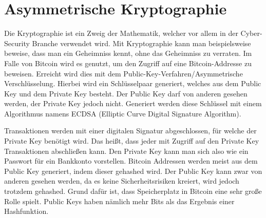 \section{Asymmetrische Kryptographie}
Die Kryptographie ist ein Zweig der Mathematik, welcher vor allem in der Cyber-Security Branche verwendet wird. Mit Kryptographie
kann man beispielsweise beweise, dass man ein Geheimniss kennt, ohne das Geheimniss zu verraten. Im Falle von Bitcoin wird es 
genutzt, um den Zugriff auf eine Bitcoin-Addresse zu beweisen. Erreicht wird dies mit dem Public-Key-Verfahren/Asymmetrische
Verschlüsselung. Hierbei wird ein Schlüsselpaar generiert, welches aus dem Public Key und dem Private Key besteht. Der Public Key
darf von anderen gesehen werden, der Private Key jedoch nicht. Generiert werden diese Schlüssel mit einem Algorithmus namens
ECDSA (Elliptic Curve Digital Signature Algorithm).

Transaktionen werden mit einer digitalen Signatur abgeschlossen, für welche der Private Key benötigt wird. Das heißt, dass jeder
mit Zugriff auf den Private Key Transaktionen abschließen kann. Den Private Key kann man sich also wie ein Passwort für ein 
Bankkonto vorstellen. Bitcoin Addressen werden meist aus dem Public Key generiert, indem dieser gehashed wird. Der Public Key
kann zwar von anderen gesehen werden, da es keine Sicherheitsrisiken kreiert, wird jedoch trotzdem gehashed. Grund dafür ist,
dass Speicherplatz in Bitcoin eine sehr große Rolle spielt. Public Keys haben nämlich mehr Bits als das Ergebnis einer
Hashfunktion.
